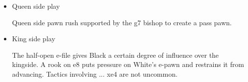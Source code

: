 \begin{itemize}
    \item{Queen side play}

    Queen side pawn rush supported by the g7 bishop to create a pass pawn. 
    \item{King side play}

    The half-open e-file gives Black a certain degree of influence over the kingside. A rook on e8 puts pressure on White's e-pawn and restrains it from advancing. Tactics involving ...\symknight{} xe4 are not uncommon.

    
    
\end{itemize} 



